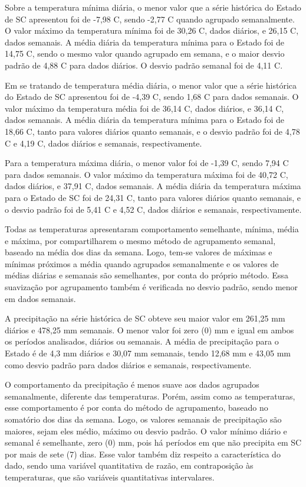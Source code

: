 \documentclass[
	12pt,				%
	openright,			%
	oneside,			%
	a4paper,			%
	english,			%
	french,				%
	spanish,			%
	brazil				%
	dvipsnames, table]{abntex2}
\begin{document}
\indent Sobre a temperatura mínima diária, o menor valor que a série histórica do Estado de \acrlong{SC} apresentou foi de -7,98 C, sendo -2,77 C quando agrupado semanalmente. O valor máximo da temperatura mínima foi de 30,26 C, dados diários, e 26,15 C, dados semanais. A média diária da temperatura mínima para o Estado foi de 14,75 C, sendo o mesmo valor quando agrupado em semana, e o maior desvio padrão de 4,88 C para dados diários. O desvio padrão semanal foi de 4,11 C.

\indent Em se tratando de temperatura média diária, o menor valor que a série histórica do Estado de \acrlong{SC} apresentou foi de -4,39 C, sendo 1,68 C para dados semanais. O valor máximo da temperatura média foi de 36,14 C, dados diários, e 36,14 C, dados semanais. A média diária da temperatura mínima para o Estado foi de 18,66 C, tanto para valores diários quanto semanais, e o desvio padrão foi de 4,78 C e 4,19 C, dados diários e semanais, respectivamente. 

\indent Para a temperatura máxima diária, o menor valor foi de -1,39 C, sendo 7,94 C para dados semanais. O valor máximo da temperatura máxima foi de 40,72 C, dados diários, e 37,91 C, dados semanais. A média diária da temperatura máxima para o Estado de \acrlong{SC} foi de 24,31 C, tanto para valores diários quanto semanais, e o desvio padrão foi de 5,41 C e 4,52 C, dados diários e semanais, respectivamente.

\indent Todas as temperaturas apresentaram comportamento semelhante, mínima, média e máxima, por compartilharem o mesmo método de agrupamento semanal, baseado na média dos dias da semana. Logo, tem-se valores de máximas e mínimas próximos a média quando agrupados semanalmente e os valores de médias diárias e semanais são semelhantes, por conta do próprio método. Essa suavização por agrupamento também é verificada no desvio padrão, sendo menor em dados semanais. 

\indent A precipitação na série histórica de \acrlong{SC} obteve seu maior valor em 261,25 mm diários e 478,25 mm semanais. O menor valor foi zero (0) mm e igual em ambos os períodos analisados, diários ou semanais. A média de precipitação para o Estado é de 4,3 mm diários e 30,07 mm semanais, tendo 12,68 mm e 43,05 mm como desvio padrão para dados diários e semanais, respectivamente.

\indent O comportamento da precipitação é menos suave aos dados agrupados semanalmente, diferente das temperaturas. Porém, assim como as temperaturas, esse comportamento é por conta do método de agrupamento, baseado no somatório dos dias da semana. Logo, os valores semanais de precipitação são maiores, sejam eles médio, máximo ou desvio padrão. O valor mínimo diário e semanal é semelhante, zero (0) mm, pois há períodos em que não precipita em \acrlong{SC} por mais de sete (7) dias. Esse valor também diz respeito a característica do dado, sendo uma variável quantitativa de razão, em contraposição às temperaturas, que são variáveis quantitativas intervalares.
\end{document}
